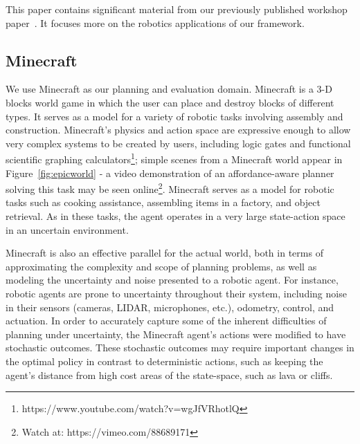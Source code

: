 \documentclass[letterpaper]{article}
\begin{document}
This paper contains significant material from our previously published
workshop paper~\cite{dabelgabrielbm14}.  It focuses more on the robotics applications
of our framework.




\subsection{Minecraft}

We use Minecraft as our planning and evaluation domain. Minecraft is a
3-D blocks world game in which the user can place and destroy blocks
of different types.   It serves as a model for a variety of robotic tasks involving assembly and construction.  Minecraft's physics and action space are expressive
enough to allow very complex systems to be created by users, including logic gates and 
functional scientific graphing calculators\footnote{https://www.youtube.com/watch?v=wgJfVRhotlQ};
simple scenes from a Minecraft world appear in Figure~\ref{fig:epicworld} - a video demonstration of
an affordance-aware planner solving this task may be seen online\footnote{Watch at: https://vimeo.com/88689171}.
Minecraft serves as a model for robotic tasks such as cooking assistance, assembling items in a factory, 
and object retrieval.  As in these tasks, the agent operates in a very large state-action space in an uncertain environment.

Minecraft is also an effective parallel for the actual world, both
in terms of approximating the complexity and scope of planning
problems, as well as modeling the uncertainty and noise presented to a
robotic agent.  For instance, robotic agents are prone to
uncertainty throughout their system, including noise in their
sensors (cameras, LIDAR, microphones, etc.), odometry, control, and
actuation.  In order to accurately capture some of the inherent
difficulties of planning under uncertainty, the Minecraft agent's
actions were modified to have stochastic outcomes. These stochastic
outcomes may require important changes in the optimal policy in
contrast to deterministic actions, such as keeping the agent's
distance from high cost areas of the state-space, such as lava or cliffs.
\end{document}
